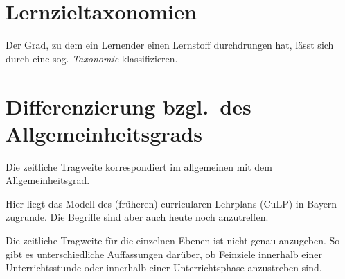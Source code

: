 \section{Lernzieltaxonomien}
Der Grad, zu dem ein Lernender einen Lernstoff durchdrungen hat, lässt sich durch eine sog. \emph{Taxonomie} klassifizieren. 

\bip\bip
\section{Differenzierung bzgl.\ des Allgemeinheitsgrads}

Die zeitliche Tragweite korrespondiert im allgemeinen mit dem
Allgemeinheitsgrad.

Hier liegt das Modell des (fr\"{u}heren) curricularen Lehrplans
(CuLP) in Bayern zugrunde.
Die Begriffe sind aber auch heute noch anzutreffen.

\mip
Die zeitliche Tragweite f\"{u}r die einzelnen Ebenen ist nicht genau
anzugeben. So gibt es unterschiedliche Auffassungen dar\"{u}ber,
ob Feinziele innerhalb einer Unterrichtsstunde oder innerhalb
einer Unterrichtsphase
anzustreben sind.

